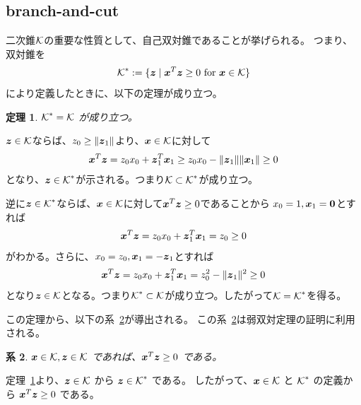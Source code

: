 \documentclass[11pt,a4paper,dvipdfmx,titlepage,uplatex]{jsarticle}
\makeatletter
\theoremstyle{mystyle}
\renewenvironment{proof}[1][\proofname]{\par
  \pushQED{\qed}%
  \normalfont \topsep6\p@\@plus6\p@\relax
  \trivlist
  \item\relax
  {\bfseries
  #1\@addpunct{.}}\hspace\labelsep\ignorespaces
}{%
  \popQED\endtrivlist\@endpefalse
}
\newcommand{\0}{\mathbf{0}}
\newtheorem{theorem}{定理}
\newtheorem{corollary}[theorem]{系}
\def\0{\mbox{\bf 0}}
\def\x{\mbox{\boldmath $x$}}
\def\z{\mbox{\boldmath $z$}}
\def\KC{\mbox{$\cal K$}}
\makeatother
\begin{document}
\subsection{branch-and-cut}\label{sec:cone-property}
二次錐$\KC$の重要な性質として、自己双対錐であることが挙げられる。
つまり、双対錐を
\begin{align}
	\KC^* := \{ \z \mid \x^T \z \ge 0 \ \text{for} \ \x \in \KC \}\label{eq:dual-cone}
\end{align}
により定義したときに、以下の定理が成り立つ。

\begin{theorem}\label{theorem:cone-property}
	$\KC^* = \KC$ が成り立つ。
\end{theorem}

\begin{proof}
	$\z \in \KC$ならば、$z_0 \ge \|\z_1\|$より、$\x \in \KC$に対して
  \begin{align}
    \x^T \z = z_0 x_0 + \z_1^T \x_1 \ge z_0 x_0 - \|\z_1\| \|\x_1\| \ge 0
  \end{align}
  となり、$\z \in \KC^*$が示される。つまり$\KC \subset \KC^*$が成り立つ。

  逆に$\z \in \KC^*$ならば、$\x \in \KC$に対して$\x^T \z \ge 0$であることから
  $x_0 = 1 , \x_1 = \0$とすれば
  \begin{align}
    \x^T \z = z_0 x_0 + \z_1^T \x_1 = z_0 \ge 0
  \end{align}
  がわかる。さらに、$x_0 = z_0 , \x_1 = - \z_1$とすれば
  \begin{align}
    \x^T \z = z_0 x_0 + \z_1^T \x_1 = z_0^2 - \|\z_1\|^2 \ge 0
  \end{align}
  となり$\z \in \KC$となる。つまり$\KC^* \subset \KC$が成り立つ。したがって$\KC = \KC^*$を得る。
\end{proof}

この定理から、以下の系~\ref{corollary:cone-property}が導出される。
この系~\ref{corollary:cone-property}は弱双対定理の証明に利用される。

\begin{corollary}\label{corollary:cone-property}
	$\x \in \KC, \z \in \KC$ であれば、$\x^T \z \ge 0$ である。
\end{corollary}
\begin{proof}
	定理~\ref{theorem:cone-property}より、$\z \in \KC $ から
	$\z \in \KC^*$ である。
	したがって、$\x \in \KC$ と $\KC^*$ の定義から $\x^T \z \ge 0$ である。
\end{proof}
\end{document}
